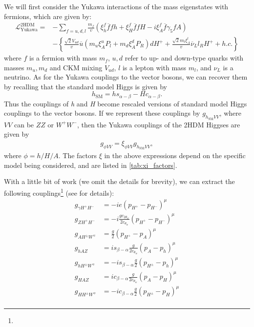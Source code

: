 We will first consider the Yukawa interactions of the mass eigenstates with fermions, which are given by:
\begin{align}
\mathcal{L}^{\mathrm{2HDM}}_{\text{Yukawa}} =& - \sum_{f = u, d, l} \frac{m_f}{v}
\left(\xi_h^f \overline{f}fh+\xi_H^f \overline{f}fH-i\xi_A^f \overline{f}\gamma_5fA \right)\\
&-\left\{\frac{\sqrt{2}V_{ud}}{v}\overline{u}\left(m_u\xi_A^uP_l+m_d\xi_A^dP_R\right)dH^+ + \frac{\sqrt{2}m_l\xi^l_A}{v}\overline{\nu}_Ll_RH^+ + h.c.\right\}
\label{eq:2HDM_Yukawa_couplings}
\end{align}
where $f$ is a fermion with mass $m_f$, $u,d$ refer to up- and down-type quarks with masses $m_u,m_d$ and CKM mixing $V_{ud}$, $l$ is a lepton with mass $m_l$, and $\nu_L$ is a neutrino. 
As for the Yukawa couplings to the vector bosons, we can recover them by recalling that the standard model Higgs is given by
\begin{equation}
h_\text{SM} = hs_{\alpha-\beta}-Hc_{\alpha-\beta}.
\end{equation}
Thus the couplings of \emph{h} and \emph{H} become rescaled versions of standard model Higgs couplings to the vector bosons. If we represent these couplings by $g_{h_\text{SM}VV}$, where $VV$ can be $ZZ$ or $W^+W^-$, then the Yukawa couplings of the 2HDM Higgses are given by
\begin{align}
g_{\phi VV} = \xi_{\phi VV}g_{h_\text{SM}VV},
\end{align}
where $\phi = h/H/A$. The factors $\xi$ in the above expressions depend on the specific model being considered, and are listed in \autoref{tab:xi_factors}.

With a little bit of work (we omit the details for brevity), we can extract the following couplings\footnote{} (see \citep{Kling2016a} for details):
\begin{align*}
g_{\gamma H^+H^-} &= -ie(p_{H^+}-p_{H^-})^\mu\\
g_{ZH^+H^-} &= -i\frac{gc_{2\theta_w}}{2c_{\theta_w}}(p_{H^+}-p_{H^-})^\mu\\
g_{AH^\pm W^\mp} &= \frac{g}{2}(p_{H^+}-p_{A})^\mu\\
g_{hAZ} &= is_{\beta-\alpha}\frac{g}{2c_{\theta_w}}(p_A-p_h)^\mu\\
g_{hH^\pm W^\mp} &= -is_{\beta-\alpha}\frac{g}{2}(p_{H^\pm}-p_h)^\mu\\
g_{HAZ} &= ic_{\beta-\alpha}\frac{g}{2c_{\theta_w}}(p_A-p_H)^\mu\\
g_{HH^\pm W^\mp} &= -ic_{\beta-\alpha}\frac{g}{2}(p_{H^\pm}-p_H)^\mu\\
\end{align*}

